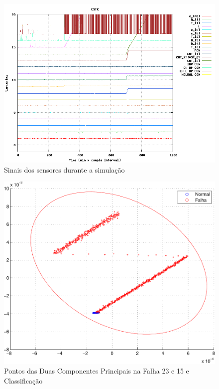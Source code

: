 \documentclass[journal]{IEEEtran}
\begin{document}
\begin{figure}[H]
	\centering
  	\includegraphics[scale=0.5]{figs/fault23_15/sinal_falha_23_15.png}
  	\caption{Sinais dos sensores durante a simulação}
	\label{fig:f23_15:s}
\end{figure}

\begin{figure}[H]
	\centering
  \includegraphics[scale=0.6]{figs/fault23_15/pontos2D.pdf}
  \caption{Pontos das Duas Componentes Principais na Falha 23 e 15 e Classificação}
	\label{fig:f23_15:2d}
\end{figure}
\end{document}
